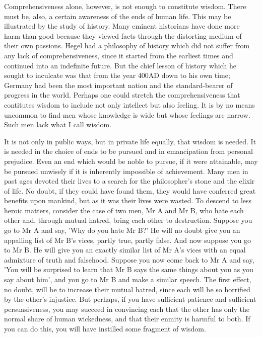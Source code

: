Comprehensiveness alone, however, is not enough to
constitute wisdom. There must be, also, a certain
awareness of the ends of human life. This may be
illustrated by the study of history. Many eminent
historians have done more harm than good because they
viewed facts through the distorting medium of their
own passions. Hegel had a philosophy of history which
did not suffer from any lack of comprehensiveness,
since it started from the earliest times and continued
into an indefinite future. But the chief lesson of
history which he sought to inculcate was that from the
year 400AD down to his own time; Germany had been the
most important nation and the standard-bearer of
progress in the world. Perhaps one could stretch the
comprehensiveness that contitutes wisdom to include
not only intellect but also feeling. It is by no means
uncommon to find men whose knowledge is wide but whose
feelings are narrow. Such men lack what I call wisdom.

It is not only in public ways, but in private life
equally, that wisdom is needed. It is needed in the
choice of ends to be pursued and in emancipation from
personal prejudice. Even an end which would be
noble to pursue, if it were attainable, may be pursued
unwisely if it is inherently impossible of
achievement. Many men in past ages devoted their lives
to a search for the philosopher's stone and the elixir
of life. No doubt, if they could have found them, they
would have conferred great benefits upon mankind, but
as it was their lives were wasted. To descend to less
heroic matters, consider the case of two men, Mr A and
Mr B, who hate each other and, through mutual hatred,
bring each other to destruction. Suppose you go to
Mr A and say, 'Why do you hate Mr B?' He will no doubt
give you an appalling list of Mr B's vices, partly
true, partly false. And now suppose you go to Mr B. He
will give you an exactly similar list of Mr A's vices
with an equal admixture of truth and falsehood.
Suppose you now come back to Mr A and say, 'You will
be surprised to learn that Mr B says the same things
about you as you say about him', and you go to Mr B
and make a similar speech. The first effect, no doubt,
will be to increase their mutual hatred, since each
will be so horrified by the other's injustice. But
perhaps, if you have sufficient patience and
sufficient persuasiveness, you may succeed in
convincing each that the other has only the normal
share of human wickedness, and that their enmity is
harmful to both. If you can do this, you will have
instilled some fragment of wisdom.

